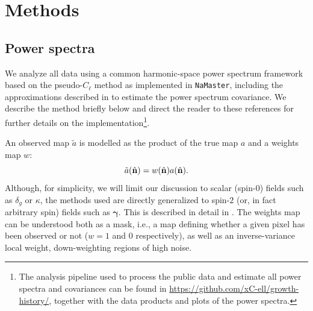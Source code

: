 \documentclass[a4paper,11pt]{article}
\newcommand{\nv}{\hat{\bf n}}
\newcommand{\shear}{\boldsymbol{\gamma}}
\newcommand{\nmt}{\texttt{NaMaster}\xspace}
\begin{document}
  \section{Methods}\label{sec:meth}
    \subsection{Power spectra}\label{ssec:meth.pcl}
      We analyze all data using a common harmonic-space power spectrum framework based on the pseudo-$C_\ell$ method as implemented in \nmt \cite{1809.09603}, including the approximations described in \cite{1906.11765,2010.09717} to estimate the power spectrum covariance. We describe the method briefly below and direct the reader to these references for further details on the implementation\footnote{The analysis pipeline used to process the public data and estimate all power spectra and covariances can be found in \url{https://github.com/xC-ell/growth-history/}, together with the data products and plots of the power spectra.}.

      An observed map $\tilde{a}$ is modelled as the product of the true map $a$ and a weights map $w$:
      \begin{equation}
        \tilde{a}(\nv) = w(\nv) a(\nv).
      \end{equation}
      Although, for simplicity, we will limit our discussion to scalar (spin-0) fields such as $\delta_g$ or $\kappa$, the methods used are directly generalized to spin-$2$ (or, in fact arbitrary spin) fields such as $\shear$. This is described in detail in \cite{1809.09603,1906.11765,2010.09717}.  The weights map can be understood both as a mask, i.e., a map defining whether a given pixel has been observed or not ($w=1$ and 0 respectively), as well as an inverse-variance local weight, down-weighting regions of high noise.
\end{document}
